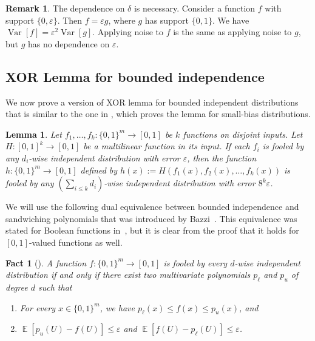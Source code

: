 \documentclass[11pt]{article}
\numberwithin{equation}{section}
\newtheorem{lemma}[theorem]{Lemma}
\newtheorem{fact}[theorem]{Fact}
\theoremstyle{definition}
\newtheorem{remark}[theorem]{Remark}
\theoremstyle{plain}
\newcommand{\zo}{\{0,1\}}
\def\eps{\varepsilon}
\DeclareMathOperator*{\E}{\mathbb{E}}                 %
\DeclareMathOperator*{\Var}{Var}                 %
\begin{document}
  \begin{remark}
    The dependence on $\delta$ is necessary.
    Consider a function $f$ with support $\{0, \eps\}$.
    Then $f = \eps g$, where $g$ has support $\zo$.  
    We have $\Var[f] = \eps^2 \Var[g]$.  
    Applying noise to $f$ is the same as applying noise to $g$, but $g$ has no dependence on $\eps$.
  \end{remark}

  \subsection{XOR Lemma for bounded independence}
  We now prove a version of XOR lemma for bounded independent distributions that is similar to the one in \cite{GopalanMRTV12}, which proves the lemma for small-bias distributions.
  \begin{lemma} \label{lemma:xor}
    Let $f_1, \ldots, f_k\colon \zo^m \to [0,1]$ be $k$ functions on disjoint inputs.
    Let $H\colon [0,1]^k \to [0,1]$ be a multilinear function in its input.
    If each $f_i$ is fooled by any $d_i$-wise independent distribution with error $\eps$,
    then the function $h\colon \zo^m \to [0,1]$ defined by $h(x) := H(f_1(x), f_2(x), \ldots, f_k(x))$ is fooled by any $(\sum_{i \le k} d_i)$-wise independent distribution with error $8^k \eps$.
  \end{lemma}

  We will use the following dual equivalence between bounded independence and sandwiching polynomials that was introduced by Bazzi~\cite{Bazzi09}.
  This equivalence was stated for Boolean functions in~\cite{Bazzi09}, but it is clear from the proof that it holds for $[0,1]$-valued functions as well.

  \begin{fact}[\cite{Bazzi09}] \label{fact:sandwiching-poly}
    A function $f\colon \zo^m \to [0,1]$ is fooled by every $d$-wise independent distribution if and only if there exist two multivariate polynomials $p_\ell$ and $p_u$ of degree $d$ such that
    \begin{enumerate}
      \item For every $x \in \zo^m$, we have $p_\ell(x) \le f(x) \le p_u(x)$, and
      \item $\E[ p_u(U) - f(U) ] \le \eps$ and $\E[ f(U) - p_\ell(U)] \le \eps$.
    \end{enumerate}
  \end{fact}
\end{document}
